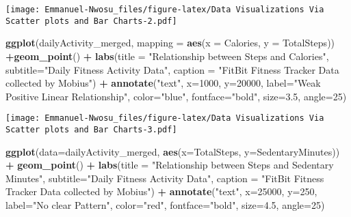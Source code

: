 \documentclass[
]{article}
\newenvironment{Shaded}{\begin{snugshade}}{\end{snugshade}}
\newcommand{\AttributeTok}[1]{\textcolor[rgb]{0.13,0.29,0.53}{#1}}
\newcommand{\DecValTok}[1]{\textcolor[rgb]{0.00,0.00,0.81}{#1}}
\newcommand{\FloatTok}[1]{\textcolor[rgb]{0.00,0.00,0.81}{#1}}
\newcommand{\FunctionTok}[1]{\textcolor[rgb]{0.13,0.29,0.53}{\textbf{#1}}}
\newcommand{\NormalTok}[1]{#1}
\newcommand{\SpecialCharTok}[1]{\textcolor[rgb]{0.81,0.36,0.00}{\textbf{#1}}}
\newcommand{\StringTok}[1]{\textcolor[rgb]{0.31,0.60,0.02}{#1}}
\begin{document}
\texttt{[image: Emmanuel-Nwosu\_files/figure-latex/Data Visualizations Via Scatter plots and Bar Charts-2.pdf]}

\begin{Shaded}
\begin{Highlighting}[]
\FunctionTok{ggplot}\NormalTok{(dailyActivity\_merged, }\AttributeTok{mapping =} \FunctionTok{aes}\NormalTok{(}\AttributeTok{x =}\NormalTok{ Calories, }\AttributeTok{y =}\NormalTok{ TotalSteps)) }\SpecialCharTok{+}\FunctionTok{geom\_point}\NormalTok{() }\SpecialCharTok{+} \FunctionTok{labs}\NormalTok{(}\AttributeTok{title =} \StringTok{"Relationship between Steps and Calories"}\NormalTok{, }\AttributeTok{subtitle=}\StringTok{"Daily Fitness Activity Data"}\NormalTok{, }\AttributeTok{caption =} \StringTok{"FitBit Fitness Tracker Data collected by Mobius"}\NormalTok{) }\SpecialCharTok{+}   \FunctionTok{annotate}\NormalTok{(}\StringTok{"text"}\NormalTok{, }\AttributeTok{x=}\DecValTok{1000}\NormalTok{, }\AttributeTok{y=}\DecValTok{20000}\NormalTok{, }\AttributeTok{label=}\StringTok{"Weak Positive Linear Relationship"}\NormalTok{, }\AttributeTok{color=}\StringTok{"blue"}\NormalTok{, }\AttributeTok{fontface=}\StringTok{"bold"}\NormalTok{, }\AttributeTok{size=}\FloatTok{3.5}\NormalTok{, }\AttributeTok{angle=}\DecValTok{25}\NormalTok{)}
\end{Highlighting}
\end{Shaded}

\texttt{[image: Emmanuel-Nwosu\_files/figure-latex/Data Visualizations Via Scatter plots and Bar Charts-3.pdf]}

\begin{Shaded}
\begin{Highlighting}[]
\FunctionTok{ggplot}\NormalTok{(}\AttributeTok{data=}\NormalTok{dailyActivity\_merged, }\FunctionTok{aes}\NormalTok{(}\AttributeTok{x=}\NormalTok{TotalSteps, }\AttributeTok{y=}\NormalTok{SedentaryMinutes)) }\SpecialCharTok{+} \FunctionTok{geom\_point}\NormalTok{() }\SpecialCharTok{+} \FunctionTok{labs}\NormalTok{(}\AttributeTok{title =} \StringTok{"Relationship between Steps and Sedentary Minutes"}\NormalTok{, }\AttributeTok{subtitle=}\StringTok{"Daily Fitness Activity Data"}\NormalTok{, }\AttributeTok{caption =} \StringTok{"FitBit Fitness Tracker Data collected by Mobius"}\NormalTok{) }\SpecialCharTok{+}   \FunctionTok{annotate}\NormalTok{(}\StringTok{"text"}\NormalTok{, }\AttributeTok{x=}\DecValTok{25000}\NormalTok{, }\AttributeTok{y=}\DecValTok{250}\NormalTok{, }\AttributeTok{label=}\StringTok{"No clear Pattern"}\NormalTok{, }\AttributeTok{color=}\StringTok{"red"}\NormalTok{, }\AttributeTok{fontface=}\StringTok{"bold"}\NormalTok{, }\AttributeTok{size=}\FloatTok{4.5}\NormalTok{, }\AttributeTok{angle=}\DecValTok{25}\NormalTok{)}
\end{Highlighting}
\end{Shaded}
\end{document}
